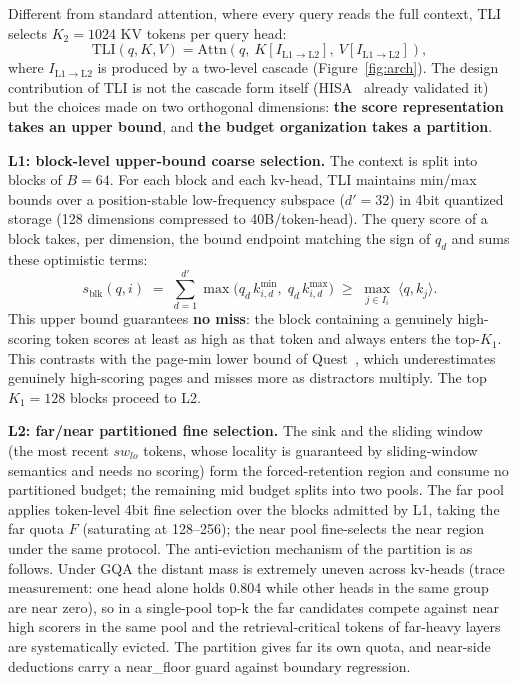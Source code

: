 \documentclass[11pt]{article}
\begin{document}
Different from standard attention, where every query reads the full context, TLI selects $K_2{=}1024$ KV tokens per query head:
\begin{equation}
\mathrm{TLI}(q, K, V) = \mathrm{Attn}\!\left(q,\ K[I_{\mathrm{L1}\rightarrow\mathrm{L2}}],\ V[I_{\mathrm{L1}\rightarrow\mathrm{L2}}]\right),
\end{equation}
where $I_{\mathrm{L1}\rightarrow\mathrm{L2}}$ is produced by a two-level cascade (Figure~\ref{fig:arch}). The design contribution of TLI is not the cascade form itself (HISA~\cite{hisa} already validated it) but the choices made on two orthogonal dimensions: \textbf{the score representation takes an upper bound}, and \textbf{the budget organization takes a partition}.

\textbf{L1: block-level upper-bound coarse selection.} The context is split into blocks of $B{=}64$. For each block and each kv-head, TLI maintains min/max bounds over a position-stable low-frequency subspace ($d'{=}32$) in 4bit quantized storage (128 dimensions compressed to 40B/token-head). The query score of a block takes, per dimension, the bound endpoint matching the sign of $q_d$ and sums these optimistic terms:
\begin{equation}
s_{\mathrm{blk}}(q, i) \;=\; \sum_{d=1}^{d'} \max\!\big(q_d\, k^{\min}_{i,d},\; q_d\, k^{\max}_{i,d}\big)\;\geq\; \max_{j\in I_i}\; \langle q, k_j \rangle.
\end{equation}
This upper bound guarantees \textbf{no miss}: the block containing a genuinely high-scoring token scores at least as high as that token and always enters the top-$K_1$. This contrasts with the page-min lower bound of Quest~\cite{quest}, which underestimates genuinely high-scoring pages and misses more as distractors multiply. The top $K_1{=}128$ blocks proceed to L2.

\textbf{L2: far/near partitioned fine selection.} The sink and the sliding window (the most recent $sw_{lo}$ tokens, whose locality is guaranteed by sliding-window semantics and needs no scoring) form the forced-retention region and consume no partitioned budget; the remaining mid budget splits into two pools. The far pool applies token-level 4bit fine selection over the blocks admitted by L1, taking the far quota $F$ (saturating at 128--256); the near pool fine-selects the near region under the same protocol. The anti-eviction mechanism of the partition is as follows. Under GQA the distant mass is extremely uneven across kv-heads (trace measurement: one head alone holds 0.804 while other heads in the same group are near zero), so in a single-pool top-k the far candidates compete against near high scorers in the same pool and the retrieval-critical tokens of far-heavy layers are systematically evicted. The partition gives far its own quota, and near-side deductions carry a near\_floor guard against boundary regression.
\end{document}
